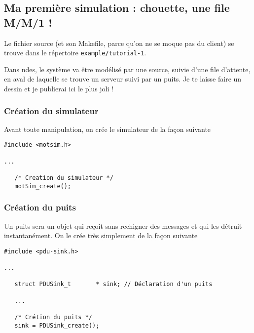\subsection{Ma première simulation : chouette, une file M/M/1 !}

   Le fichier source (et son Makefile, parce qu'on ne se moque pas du
client) se trouve dans le répertoire {\tt example/tutorial-1}.

   Dans {\sc ndes}, le système va être modélisé par une source, suivie
d'une file d'attente, en aval de laquelle se trouve un serveur suivi
par un puits. Je te laisse faire un dessin et je publierai ici le plus
joli !

\subsubsection{Création du simulateur}

   Avant toute manipulation, on crée le simulateur de la façon suivante

\begin{verbatim}
#include <motsim.h>

...

   /* Creation du simulateur */
   motSim_create();
\end{verbatim}

\subsubsection{Création du puits}

   Un puits sera un objet qui reçoit sans rechigner des messages et
qui les détruit instantanément. On le crée très simplement de la façon
suivante

\begin{verbatim}
#include <pdu-sink.h>

...

   struct PDUSink_t       * sink; // Déclaration d'un puits

   ...

   /* Crétion du puits */
   sink = PDUSink_create();
\end{verbatim}

%
